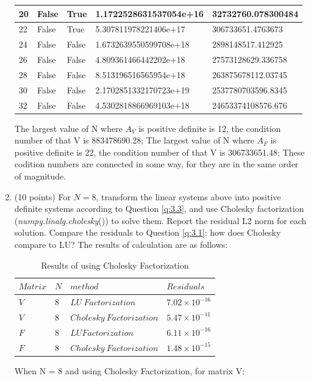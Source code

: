 \documentclass[10pt]{article}
\begin{document}
\begin{enumerate}[label=3.\arabic*]
\begin{table}[H]
\begin{tabular}{|l|l|l|l|l|}
    20 & False & True  & 1.1722528631537054e+16 & 32732760.078300484 \\ \hline
    22 & False & True  & 5.307811978221406e+17  & 306733651.4763673  \\ \hline
    24 & False & False & 1.6732639550599708e+18 & 2898148517.412925  \\ \hline
    26 & False & False & 4.809361466442202e+18  & 27573128629.336758 \\ \hline
    28 & False & False & 8.513196516565954e+18  & 263875678112.03745 \\ \hline
    30 & False & False & 2.1702851332170723e+19 & 2537780703596.8345 \\ \hline
    32 & False & False & 4.5302818866969103e+18 & 24653374108576.676 \\ \hline
    	\end{tabular}
    \end{table}
	The largest value of N where $A_V$ is positive definite is 12, the condition number of that V is 883478690.28;	The largest value of N where $A_F$ is positive definite is 22, the condition number of that V is 306733651.48; These codition numbers are connected in some way, for they are in the same order of magnitude.
    \item (10 points)
    For $N = 8$, transform the linear systems above into positive definite systems according to Question \ref{q:3.3}, and use Cholesky factorization (\textit{numpy.linalg.cholesky}()) to solve them. Report the residual L2 norm for each solution. Compare the residuals to Question \ref{q:3.1}: how does Cholesky compare to LU?
	The results of calculation are as follows:
	\begin{table}[H]
		\centering
		\begin{tabular}{|l|l|l|l|}
			\hline
			$Matrix$& $N$ &$method$ & $Residuals$  \\ \hline
			$V$& $8$ &$LU\ Factorization$& $7.02\times 10^{-16}$  \\ \hline
			$V$& $8$ &$Cholesky\ Factorization$& $5.47\times 10^{-11}$ \\ \hline
			$F$& $8$ &$LU Factorization$& $6.11\times 10^{-16}$  \\ \hline
			$F$& $8$ &$Cholesky\ Factorization$& $1.48\times 10^{-15}$ \\ \hline
		\end{tabular}
		\caption{Results of using Cholesky Factorization}
	\end{table}
	When N = 8 and using Cholesky Factorization, for matrix V: 
	\begin{equation}      

\end{equation}
\end{enumerate}
\end{document}
